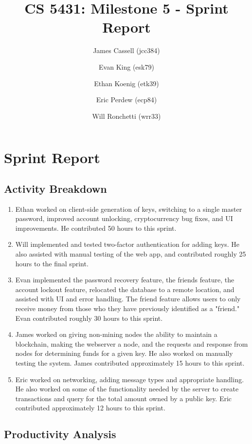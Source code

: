 \documentclass[a4paper,12pt]{article}
\title{CS 5431: Milestone 5 - Sprint Report}
\author{
James Cassell (jcc384)
\and
Evan King (esk79)
\and
Ethan Koenig (etk39)
\and
Eric Perdew (ecp84)
\and
Will Ronchetti (wrr33)
}
\begin{document}
\maketitle

\section{Sprint Report}

\subsection{Activity Breakdown}

\begin{enumerate} %
\item Ethan worked on client-side generation of keys, switching to a single master password, improved account unlocking, cryptocurrency bug fixes, and UI improvements. He contributed 50 hours to this sprint.
\item Will implemented and tested two-factor authentication for adding keys. He also assisted with manual testing of the web app, and contributed roughly 25 hours to the final sprint.
\item Evan implemented the password recovery feature, the friends feature, the account lockout feature, relocated the database to a remote location, and assisted with UI and error handling. The friend feature allows users to only receive money from those who they have previously identified as a "friend." Evan contributed roughly 30 hours to this sprint.
\item James worked on giving non-mining nodes the ability to maintain a blockchain, making the webserver a node, and the requests and response from nodes for determining funds for a given key.
  He also worked on manually testing the system.
  James contributed approximately 15 hours to this sprint.
\item Eric worked on networking, adding message types and appropriate handling.
He also worked on some of the functionality needed by the server to create transactions and query for the total amount owned by a public key.
Eric contributed approximately 12 hours to this sprint.
\end{enumerate}

\subsection{Productivity Analysis}
\end{document}
